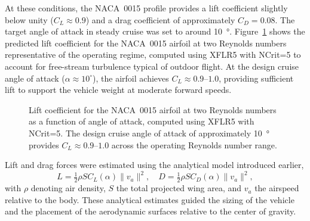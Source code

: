 At these conditions, the NACA~0015 profile provides a lift coefficient slightly below unity (\(C_L \approx 0.9\)) and a drag coefficient of approximately \(C_D = 0.08\).  
The target angle of attack in steady cruise was set to around \SI{10}{\degree}.  
Figure~\ref{fig:naca0015_cl} shows the predicted lift coefficient for the NACA~0015 airfoil at two Reynolds numbers representative of the operating regime, computed using XFLR5 with NCrit=5 to account for free-stream turbulence typical of outdoor flight.
At the design cruise angle of attack (\(\alpha \approx 10^\circ\)), the airfoil achieves \(C_L \approx 0.9\)--\(1.0\), providing sufficient lift to support the vehicle weight at moderate forward speeds.

\begin{figure}[htbp]
\centering

\caption{Lift coefficient for the NACA~0015 airfoil at two Reynolds numbers as a function of angle of attack, computed using XFLR5 with NCrit=5. The design cruise angle of attack of approximately \SI{10}{\degree} provides \(C_L \approx 0.9\)--\(1.0\) across the operating Reynolds number range.}
\label{fig:naca0015_cl}
\end{figure}

Lift and drag forces were estimated using the analytical model introduced earlier,
\[
L = \tfrac{1}{2} \rho S C_L(\alpha) \|v_a\|^2, \quad
D = \tfrac{1}{2} \rho S C_D(\alpha) \|v_a\|^2,
\]
with \(\rho\) denoting air density, \(S\) the total projected wing area, and \(v_a\) the airspeed relative to the body.  
These analytical estimates guided the sizing of the vehicle and the placement of the aerodynamic surfaces relative to the center of gravity.

